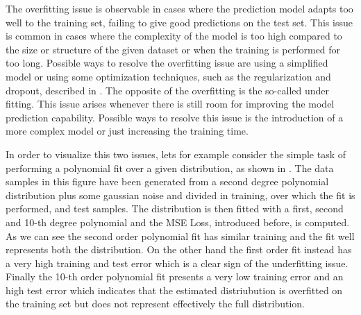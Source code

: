 The overfitting\cite{overfitting} issue is observable in cases where the prediction model adapts too well to the training set, failing to give good predictions on the test set. This issue is common in cases where the complexity of the model is too high compared to the size or structure of the given dataset or when the training is performed for too long. Possible ways to resolve the overfitting issue are using a simplified model or using some optimization techniques, such as the regularization and dropout, described in .
The opposite of the overfitting is the so-called under fitting. This issue arises whenever there is still room for improving the model prediction capability. Possible ways to resolve this issue is the introduction of a more complex model or just increasing the training time.

In order to visualize this two issues, lets for example consider the simple task of performing a polynomial fit over a given distribution, as shown in  . The data samples in this figure have been generated from a second degree polynomial distribution plus some gaussian noise and divided in training, over which the fit is performed, and test samples. The distribution is then fitted with a first, second and 10-th degree polynomial and the MSE Loss, introduced before, is computed. As we can see the second order polynomial fit has similar training and the fit well represents both the distribution. On the other hand the first order fit instead has a very high training and test error which is a clear sign of the underfitting issue. Finally the 10-th order polynomial fit presents a very low training error and an high test error which indicates that the estimated distriubution is overfitted on the training set but does not represent effectively the full distribution.

